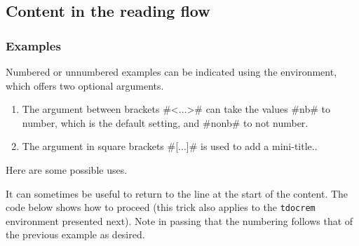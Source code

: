 \subsection{Content in the reading flow}

\subsubsection{Examples}

Numbered or unnumbered examples can be indicated using the  environment, which offers two optional arguments.

\begin{enumerate}
    \item The  argument between brackets \tdocinlatex#<...># can take the values \tdocinlatex#nb# to number, which is the default setting, and \tdocinlatex#nonb# to not number.

    \item The  argument in square brackets \tdocinlatex#[...]# is used to add a mini-title..
\end{enumerate}


Here are some possible uses.










\begin{tdoctip}
    It can sometimes be useful to return to the line at the start of the content. The code below shows how to proceed (this trick also applies to the \verb#tdocrem# environment presented next). Note in passing that the numbering follows that of the previous example as desired.
\end{tdoctip}





